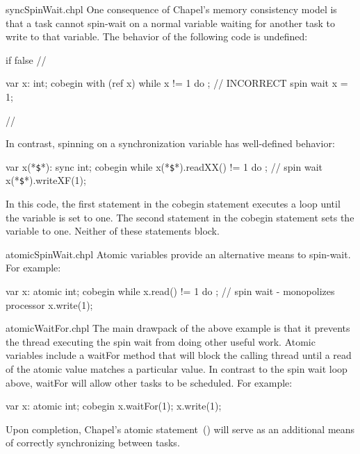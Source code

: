 \begin{chapelexample}{syncSpinWait.chpl}
One consequence of Chapel's memory consistency model is that a task cannot spin-wait on a
normal variable waiting for another task to write to that variable.  The behavior of
the following code is undefined:

\begin{chapelpre}
if false { // }
\end{chapelpre}
\begin{chapel}
var x: int;
cobegin with (ref x) {
  while x != 1 do ;  // INCORRECT spin wait
  x = 1;
}
\end{chapel}
\begin{chapelnoprint}
// {
}
\end{chapelnoprint}
In contrast, spinning on a synchronization variable has well-defined
behavior:
\begin{chapel}
var x(*\texttt{\$}*): sync int;
cobegin {
  while x(*\texttt{\$}*).readXX() != 1 do ;  // spin wait
  x(*\texttt{\$}*).writeXF(1);
}
\end{chapel}
\begin{chapeloutput}
\end{chapeloutput}

In this code, the first statement in the cobegin statement executes a
loop until the variable is set to one.  The second statement in the
cobegin statement sets the variable to one.  Neither of these
statements block.
\end{chapelexample}

\begin{chapelexample}{atomicSpinWait.chpl}
Atomic variables provide an alternative means to spin-wait.
For example:

\begin{chapel}
var x: atomic int;
cobegin {
  while x.read() != 1 do ;  // spin wait - monopolizes processor
  x.write(1);
}
\end{chapel}
\begin{chapeloutput}
\end{chapeloutput}

\end{chapelexample}


\begin{chapelexample}{atomicWaitFor.chpl}
The main drawpack of the above example is that it prevents the thread
executing the spin wait from doing other useful work. Atomic variables
include a waitFor method that will block the calling thread until a read
of the atomic value matches a particular value. In contrast to the spin
wait loop above, waitFor will allow other tasks to be scheduled. For
example:

\begin{chapel}
var x: atomic int;
cobegin {
  x.waitFor(1);
  x.write(1);
}
\end{chapel}
\begin{chapeloutput}
\end{chapeloutput}

\end{chapelexample}


\begin{future}
Upon completion, Chapel's atomic statement~() will serve as
an additional means of correctly synchronizing between tasks.
\end{future}

